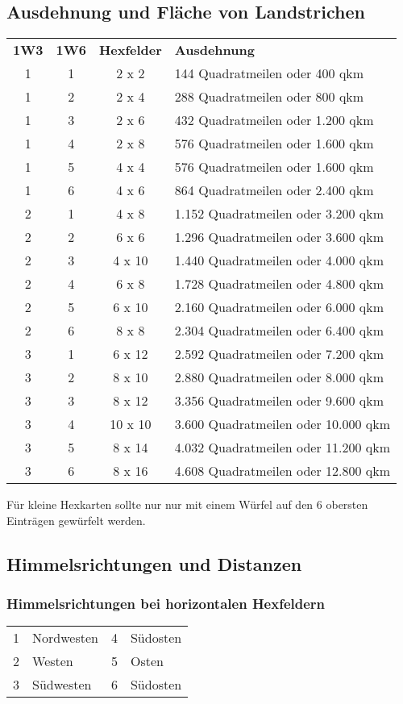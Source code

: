 \subsection{Ausdehnung und Fläche von Landstrichen}
\begin{tabularx}{\columnwidth}{cccZ}
\textbf{1W3} & \textbf{1W6} & \textbf{Hexfelder} &
\textbf{Ausdehnung} \\
1 & 1 & 2 x 2 & 144 Quadratmeilen oder 400 qkm\\
1 & 2 & 2 x 4 & 288 Quadratmeilen oder 800 qkm\\
1 & 3 & 2 x 6 & 432 Quadratmeilen oder 1.200 qkm\\
1 & 4 & 2 x 8 & 576 Quadratmeilen oder 1.600 qkm\\
1 & 5 & 4 x 4 & 576 Quadratmeilen oder 1.600 qkm\\
1 & 6 & 4 x 6 & 864 Quadratmeilen oder 2.400 qkm\\
2 & 1 & 4 x 8 & 1.152 Quadratmeilen oder 3.200 qkm\\
2 & 2 & 6 x 6 & 1.296 Quadratmeilen oder 3.600 qkm\\
2 & 3 & 4 x 10 & 1.440 Quadratmeilen oder 4.000 qkm\\
2 & 4 & 6 x 8 & 1.728 Quadratmeilen oder 4.800 qkm\\
2 & 5 & 6 x 10 & 2.160 Quadratmeilen oder 6.000 qkm\\
2 & 6 & 8 x 8 & 2.304 Quadratmeilen oder 6.400 qkm\\
3 & 1 & 6 x 12 & 2.592 Quadratmeilen oder 7.200 qkm\\
3 & 2 & 8 x 10 & 2.880 Quadratmeilen oder 8.000 qkm\\
3 & 3 & 8 x 12 & 3.356 Quadratmeilen oder 9.600 qkm\\
3 & 4 & 10 x 10 & 3.600 Quadratmeilen oder 10.000 qkm\\
3 & 5 & 8 x 14 & 4.032 Quadratmeilen oder 11.200 qkm\\
3 & 6 & 8 x 16 & 4.608 Quadratmeilen oder 12.800 qkm\\
\end{tabularx}

Für kleine Hexkarten sollte nur nur mit einem Würfel 
auf den 6 obersten Einträgen gewürfelt werden.

\subsection{Himmelsrichtungen und
Distanzen}\label{himmelsrichtungen-und-distanzen}

\subsubsection{Himmelsrichtungen bei horizontalen Hexfeldern}
\begin{tabularx}{\columnwidth}{cZcZ}
1 & Nordwesten & 4 & Südosten\\
2 & Westen & 5 & Osten\\
3 & Südwesten & 6 & Südosten\\
\end{tabularx}

